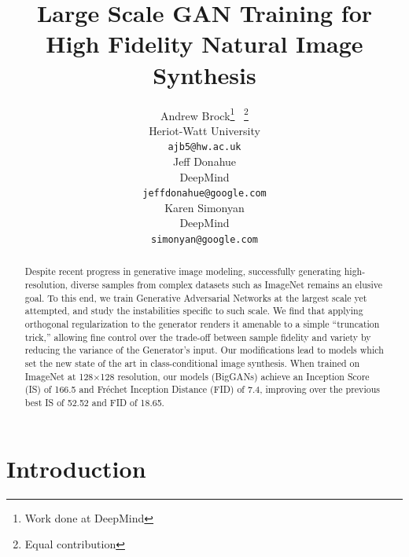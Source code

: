 \documentclass{article} %
\title{Large Scale GAN Training for\\ High Fidelity Natural Image Synthesis}
\author{Andrew Brock\thanks{Work done at DeepMind} \ \thanks{Equal contribution} \\
Heriot-Watt University\\
\texttt{ajb5@hw.ac.uk} \\
\And
Jeff Donahue\footnotemark[2] \\
DeepMind \\
\texttt{jeffdonahue@google.com} \\
\And
Karen Simonyan\footnotemark[2] \\
DeepMind \\
\texttt{simonyan@google.com}
}
\begin{document}
\maketitle

\begin{abstract}
Despite recent progress in generative image modeling, successfully generating high-resolution, diverse samples from complex datasets such as ImageNet remains an elusive goal. To this end, we train Generative Adversarial Networks at the largest scale yet attempted, and study the instabilities specific to such scale. We find that applying orthogonal regularization to the generator renders it amenable to a simple ``truncation trick,'' allowing fine control over the trade-off between sample fidelity and variety by reducing the variance of the Generator's input. Our modifications lead to models which set the new state of the art in class-conditional image synthesis. When trained on ImageNet at 128$\times$128 resolution, our models (BigGANs) achieve an Inception Score (IS) of 166.5 and Fr\'echet Inception Distance (FID) of 7.4, improving over the previous best IS of 52.52 and FID of 18.65.


\end{abstract}


\section{Introduction} 
\label{intro}
\end{document}
